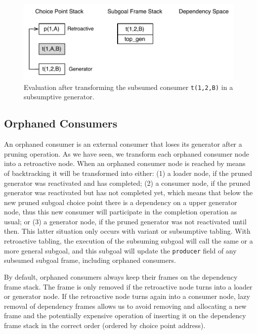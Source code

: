 \begin{figure}[ht]
  \centering
    \includegraphics[scale=0.5]{retro_sub4.pdf}
  \caption{Evaluation after transforming the subsumed consumer \texttt{t(1,2,B)} in a subsumptive generator.}
  \label{fig:retro_sub4}
\end{figure}

\subsection{Orphaned Consumers}

An orphaned consumer is an external consumer that loses its generator after a pruning operation.
As we have seen, we transform each orphaned consumer node into a retroactive node.
When an orphaned consumer node is reached by means of backtracking it will be transformed into either:
(1) a loader node, if the pruned generator was reactivated and has completed; (2) a consumer node,
if the pruned generator was reactivated but has not completed yet, which means that below the new pruned subgoal
choice point there is a dependency on a upper generator node, thus this new consumer will participate
in the completion operation as usual; or (3) a generator node,
if the pruned generator was not reactivated until then. This latter situation only occurs with
variant or subsumptive tabling. With retroactive tabling, the execution of the subsuming subgoal
will call the same or a more general subgoal, and this subgoal will update the \texttt{producer} field
of any subsumed subgoal frame, including orphaned consumers.

By default, orphaned consumers always keep their frames on the dependency frame stack. The frame is only
removed if the retroactive node turns into a loader or generator node. If the retroactive node turns again
into a consumer node, lazy removal of dependency frames allows us to avoid removing and allocating a new
frame and the potentially expensive operation of inserting it on the dependency frame stack in the
correct order (ordered by choice point address).


